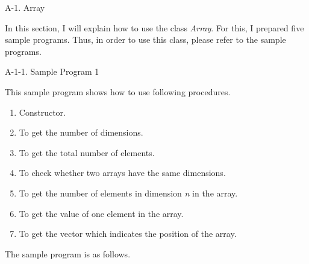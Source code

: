 \noindent
{\Large A-1. Array}

\vspace*{7mm}

\noindent
In this section, I will explain how to use the class {\em Array}. For
this, I prepared five sample programs. Thus, in order to use this
class, please refer to the sample programs.


\vspace*{10mm}

\noindent
{\Large A-1-1. Sample Program 1}

\vspace*{7mm}

\noindent
This sample program shows how to use following procedures.

\begin{enumerate}
\item Constructor.
\item To get the number of dimensions.
\item To get the total number of elements.
\item To check whether two arrays have the same dimensions.
\item To get the number of elements in dimension {\em n} in the array.
\item To get the value of one element in the array.
\item To get the vector which indicates the position of the array.
\end{enumerate}

\vspace*{5mm}

\noindent
The sample program is as follows.

\clearpage

